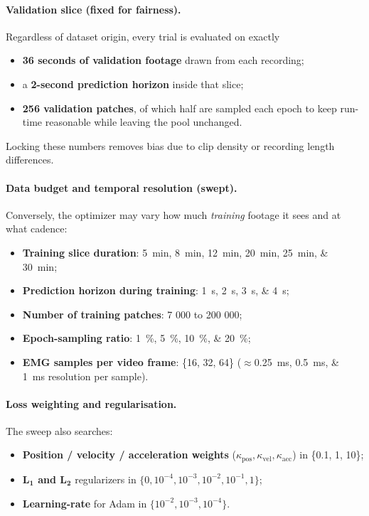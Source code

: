 \paragraph{Validation slice (fixed for fairness).}
Regardless of dataset origin, every trial is evaluated on exactly

\begin{itemize}
  \item \textbf{36 seconds of validation footage} drawn from each recording;
  \item a \textbf{2-second prediction horizon} inside that slice;
  \item \textbf{256 validation patches}, of which half are sampled each epoch
        to keep run-time reasonable while leaving the pool unchanged.
\end{itemize}

Locking these numbers removes bias due to clip density or recording length
differences.

\paragraph{Data budget and temporal resolution (swept).}
Conversely, the optimizer may vary how much \emph{training} footage it sees and
at what cadence:

\begin{itemize}
  \item \textbf{Training slice duration}: \SIlist{5;8;12;20;25;30}{min};
  \item \textbf{Prediction horizon during training}: \SIlist{1;2;3;4}{s};
  \item \textbf{Number of training patches}: 7 000 to 200 000;
  \item \textbf{Epoch-sampling ratio}: \SIlist{1;5;10;20}{\%};
  \item \textbf{EMG samples per video frame}: \{16, 32, 64\}
        (\(\approx\)\SIlist{0.25;0.5;1}{ms} resolution per sample).
\end{itemize}

\paragraph{Loss weighting and regularisation.}
The sweep also searches:

\begin{itemize}
  \item \textbf{Position / velocity / acceleration weights}
        (\(\kappa_{\text{pos}},\kappa_{\text{vel}},\kappa_{\text{acc}}\))
        in \{0.1, 1, 10\};
  \item \textbf{L\(_\mathbf{1}\) and L\(_\mathbf{2}\)} regularizers in
        \(\{0,10^{-4},10^{-3},10^{-2},10^{-1},1\}\);
  \item \textbf{Learning-rate} for Adam in \(\{10^{-2},10^{-3},10^{-4}\}\).
\end{itemize}

